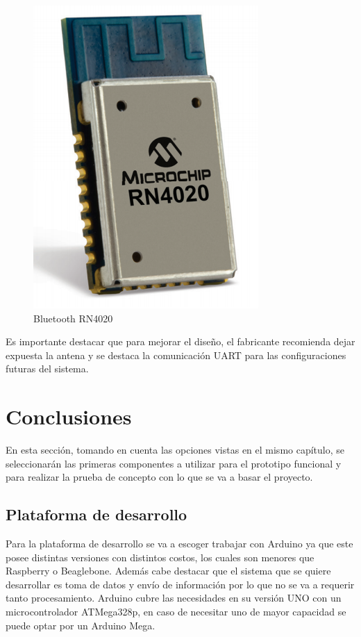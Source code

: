 \begin{figure}[H]
\centering
\includegraphics[scale=0.5]{figuras/com/rn4020.png}
\caption{Bluetooth RN4020}
\label{bt}
\end{figure}

Es importante destacar que para mejorar el diseño, el fabricante recomienda dejar expuesta la antena y se destaca la comunicación UART para las configuraciones futuras del sistema.

\newpage

\section{Conclusiones}
En esta sección, tomando en cuenta las opciones vistas en el mismo capítulo, se seleccionarán las primeras componentes a utilizar para el prototipo funcional y para realizar la prueba de concepto con lo que se va a basar el proyecto.
\subsection{Plataforma de desarrollo}
Para la plataforma de desarrollo se va a escoger trabajar con Arduino ya que este posee distintas versiones con distintos costos, los cuales son menores que Raspberry o Beaglebone. Además cabe destacar que el sistema que se quiere desarrollar es toma de datos y envío de información por lo que no se va a requerir tanto procesamiento. Arduino cubre las necesidades en su versión UNO con un microcontrolador ATMega328p, en caso de necesitar uno de mayor capacidad se puede optar por un Arduino Mega.
